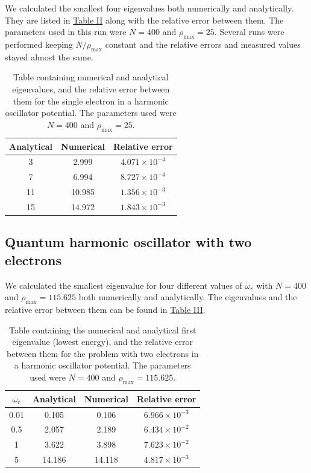 \documentclass[reprint,english,notitlepage]{revtex4-1}  %
\begin{document}
We calculated the smallest four eigenvalues both numerically and analytically. They are listed in \hyperref[table:IV:b:1]{Table II} along with the relative error between them. The parameters used in this run were $N=400$ and $\rho_\text{max} = 25$. Several runs were performed keeping $N/\rho_\text{max}$ constant and the relative errors and measured values stayed almost the same.

\begin{table}[h!] \label{table:IV:b:1}
\caption{Table containing numerical and analytical eigenvalues, and the relative error between them for the single electron in a harmonic oscillator potential. The parameters used were $N=400$ and $\rho_\text{max} = 25$.}
\begin{tabular}{|c|c|c|}
\hline
Analytical & Numerical & Relative error \\
\hline
    3     &      2.999   &    $4.071 \times 10^{-4}$ \\
\hline
    7     &      6.994   &    $8.727 \times 10^{-4}$ \\
\hline
   11     &     10.985   &    $1.356 \times 10^{-3}$ \\
\hline
   15     &     14.972   &    $1.843 \times 10^{-3}$ \\
\hline
\end{tabular}
\end{table}


\subsection{Quantum harmonic oscillator with two electrons}\label{sec:IV:c}

We calculated the smallest eigenvalue for four different values of $\omega_r$ with $N=400$ and $\rho_\text{max} = 115.625$ both numerically and analytically. The eigenvalues and the relative error between them can be found in \hyperref[table:IV:c:1]{Table III}.

\begin{table}[h!] \label{table:IV:c:1}
\caption{Table containing the numerical and analytical first eigenvalue (lowest energy), and the relative error between them for the problem with two electrons in a harmonic oscillator potential. The parameters used were $N=400$ and $\rho_\text{max} = 115.625$.}
\begin{tabular}{|c|c|c|c|}
\hline
$\omega_r$ & Analytical & Numerical & Relative error \\
\hline
0.01 &    0.105    &      0.106  &    $6.966 \times 10^{-3}$ \\
\hline
0.5 &    2.057     &      2.189   &    $6.434 \times 10^{-2}$ \\
\hline
1 &   3.622     &     3.898   &    $7.623 \times 10^{-2}$ \\
\hline
5 &   14.186     &     14.118   &    $4.817 \times 10^{-3}$ \\
\hline
\end{tabular}
\end{table}
\end{document}
